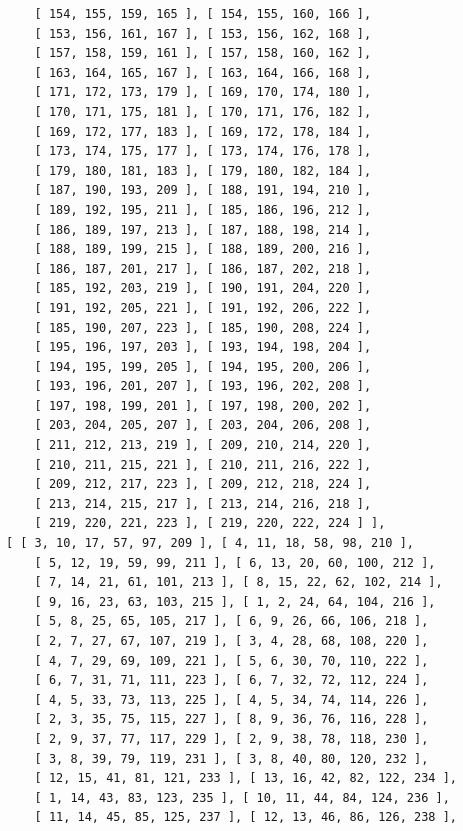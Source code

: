 \documentclass{article}
\begin{document}
\begin{verbatim}
          [ 154, 155, 159, 165 ], [ 154, 155, 160, 166 ], 
          [ 153, 156, 161, 167 ], [ 153, 156, 162, 168 ], 
          [ 157, 158, 159, 161 ], [ 157, 158, 160, 162 ], 
          [ 163, 164, 165, 167 ], [ 163, 164, 166, 168 ], 
          [ 171, 172, 173, 179 ], [ 169, 170, 174, 180 ], 
          [ 170, 171, 175, 181 ], [ 170, 171, 176, 182 ], 
          [ 169, 172, 177, 183 ], [ 169, 172, 178, 184 ], 
          [ 173, 174, 175, 177 ], [ 173, 174, 176, 178 ], 
          [ 179, 180, 181, 183 ], [ 179, 180, 182, 184 ], 
          [ 187, 190, 193, 209 ], [ 188, 191, 194, 210 ], 
          [ 189, 192, 195, 211 ], [ 185, 186, 196, 212 ], 
          [ 186, 189, 197, 213 ], [ 187, 188, 198, 214 ], 
          [ 188, 189, 199, 215 ], [ 188, 189, 200, 216 ], 
          [ 186, 187, 201, 217 ], [ 186, 187, 202, 218 ], 
          [ 185, 192, 203, 219 ], [ 190, 191, 204, 220 ], 
          [ 191, 192, 205, 221 ], [ 191, 192, 206, 222 ], 
          [ 185, 190, 207, 223 ], [ 185, 190, 208, 224 ], 
          [ 195, 196, 197, 203 ], [ 193, 194, 198, 204 ], 
          [ 194, 195, 199, 205 ], [ 194, 195, 200, 206 ], 
          [ 193, 196, 201, 207 ], [ 193, 196, 202, 208 ], 
          [ 197, 198, 199, 201 ], [ 197, 198, 200, 202 ], 
          [ 203, 204, 205, 207 ], [ 203, 204, 206, 208 ], 
          [ 211, 212, 213, 219 ], [ 209, 210, 214, 220 ], 
          [ 210, 211, 215, 221 ], [ 210, 211, 216, 222 ], 
          [ 209, 212, 217, 223 ], [ 209, 212, 218, 224 ], 
          [ 213, 214, 215, 217 ], [ 213, 214, 216, 218 ], 
          [ 219, 220, 221, 223 ], [ 219, 220, 222, 224 ] ], 
      [ [ 3, 10, 17, 57, 97, 209 ], [ 4, 11, 18, 58, 98, 210 ], 
          [ 5, 12, 19, 59, 99, 211 ], [ 6, 13, 20, 60, 100, 212 ], 
          [ 7, 14, 21, 61, 101, 213 ], [ 8, 15, 22, 62, 102, 214 ], 
          [ 9, 16, 23, 63, 103, 215 ], [ 1, 2, 24, 64, 104, 216 ], 
          [ 5, 8, 25, 65, 105, 217 ], [ 6, 9, 26, 66, 106, 218 ], 
          [ 2, 7, 27, 67, 107, 219 ], [ 3, 4, 28, 68, 108, 220 ], 
          [ 4, 7, 29, 69, 109, 221 ], [ 5, 6, 30, 70, 110, 222 ], 
          [ 6, 7, 31, 71, 111, 223 ], [ 6, 7, 32, 72, 112, 224 ], 
          [ 4, 5, 33, 73, 113, 225 ], [ 4, 5, 34, 74, 114, 226 ], 
          [ 2, 3, 35, 75, 115, 227 ], [ 8, 9, 36, 76, 116, 228 ], 
          [ 2, 9, 37, 77, 117, 229 ], [ 2, 9, 38, 78, 118, 230 ], 
          [ 3, 8, 39, 79, 119, 231 ], [ 3, 8, 40, 80, 120, 232 ], 
          [ 12, 15, 41, 81, 121, 233 ], [ 13, 16, 42, 82, 122, 234 ], 
          [ 1, 14, 43, 83, 123, 235 ], [ 10, 11, 44, 84, 124, 236 ], 
          [ 11, 14, 45, 85, 125, 237 ], [ 12, 13, 46, 86, 126, 238 ], 

\end{verbatim}
\end{document}
